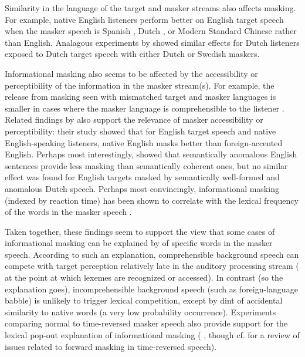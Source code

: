 Similarity in the language of the target and masker streams also affects masking.  For example, native English listeners perform better on English target speech when the masker speech is Spanish \citep{GarciaLecumberriCooke2006}, Dutch \citep{BrouwerEtAl2012}, or Modern Standard Chinese \citep{VanEngenBradlow2007} rather than English.  Analagous experiments by \citet{RhebergenEtAl2005} showed similar effects for Dutch listeners exposed to Dutch target speech with either Dutch or Swedish maskers.  

Informational masking also seems to be affected by the accessibility or perceptibility of the information in the masker stream(s).  For example, the release from masking seen with mismatched target and masker languages is smaller in cases where the masker language is comprehensible to the listener \citep{VanEngen2010}.  Related findings by \citet{CalandruccioEtAl2010} also support the relevance of masker accessibility or perceptibility: their study showed that for English target speech and native English-speaking listeners, native English masks better than foreign-accented English.\footnotemark{}  Perhaps most interestingly, \citet{BrouwerEtAl2012} showed that semantically anomalous English sentences provide less masking than semantically coherent ones, but no similar effect was found for English targets masked by semantically well-formed and anomalous Dutch speech.  Perhaps most convincingly, informational masking (indexed by reaction time) has been shown to correlate with the lexical frequency of the words in the masker speech \citep{BoulengerEtAl2010}.

Taken together, these findings seem to support the view that some cases of informational masking can be explained by  of specific words in the masker speech.  According to such an explanation, comprehensible background speech can compete with target perception relatively late in the auditory processing stream (\ie{} at the point at which lexemes are recognized or accessed).  In contrast (so the explanation goes), incomprehensible background speech (such as foreign-language babble) is unlikely to trigger lexical competition, except by dint of accidental similarity to native words (a very low probability occurrence).  Experiments comparing normal to time-reversed masker speech also provide support for the lexical pop-out explanation of informational masking (\eg{} \citealt{HoenEtAl2007}, though cf. \citealt{RhebergenEtAl2005} for a review of issues related to forward masking in time-reversed speech).

